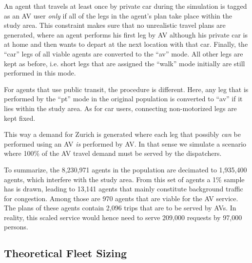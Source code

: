 
An agent that travels at least once by private car during the simulation is tagged
as an AV user \textit{only} if all of the legs in the agent's plan take place
within the study area. This constraint makes sure that no unrealistic travel
plans are generated, where an agent performs his first leg by AV although his
private car is at home and then wants to depart at the next location with that
car. Finally, the ``car'' legs of all viable agents are converted to the ``av'' mode.
All other legs are kept as before, i.e. short legs that are assigned the ``walk''
mode initially are still performed in this mode.

For agents that use public transit, the procedure is different. Here, any leg
that is performed by the ``pt'' mode in the original population is converted to ``av''
if it lies within the study area. As for car users, connecting non-motorized
legs are kept fixed.

This way a demand for Zurich is generated where each leg that possibly
\textit{can} be performed using an AV \textit{is} performed by AV. In that sense we
simulate a scenario where 100\% of the AV travel demand must be served by the
dispatchers.

To summarize, the 8,230,971 agents in the population are decimated to
1,935,400 agents, which interfere with the study area. From this set of agents
a 1\% sample has is drawn, leading to 13,141 agents that mainly constitute
background traffic for congestion. Among those are 970 agents that are viable for the AV
service. The plans of these agents contain 2,096 trips that are to be served by
AVs. In reality, this scaled service would hence need to serve 209,000 requests by
97,000 persons.

\subsection{Theoretical Fleet Sizing}


